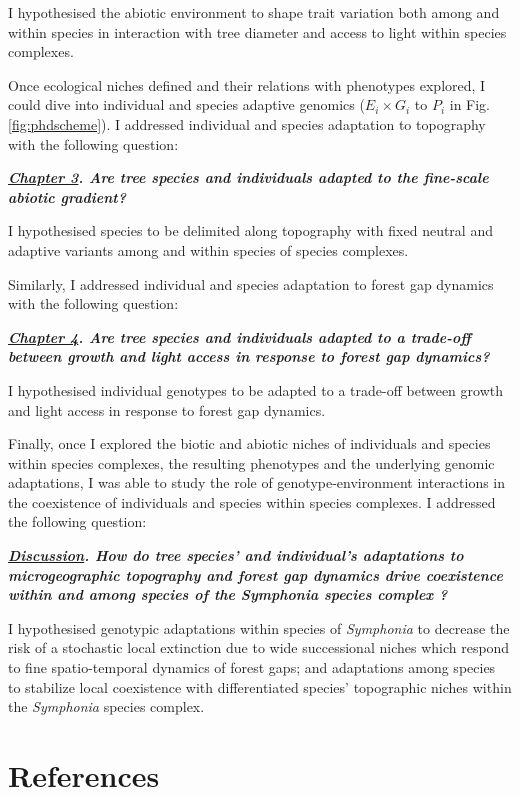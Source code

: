 \documentclass[12pt,twoside,a4paper, a]{article}
\let\oldsection\section
\renewcommand\section{\clearpage\oldsection}
\begin{document}
I hypothesised the abiotic environment to shape trait variation both among and within species in interaction with tree diameter and access to light within species complexes.

Once ecological niches defined and their relations with phenotypes explored, I could dive into individual and species adaptive genomics (\(E_i\times G_i\) to \(P_i\) in Fig. \ref{fig:phdscheme}).
I addressed individual and species adaptation to topography with the following question:

\textbf{\emph{\protect\hyperlink{Ch3}{Chapter 3}. Are tree species and individuals adapted to the fine-scale abiotic gradient?}}

I hypothesised species to be delimited along topography with fixed neutral and adaptive variants among and within species of species complexes.

Similarly, I addressed individual and species adaptation to forest gap dynamics with the following question:

\textbf{\emph{\protect\hyperlink{Ch4}{Chapter 4}. Are tree species and individuals adapted to a trade-off between growth and light access in response to forest gap dynamics?}}

I hypothesised individual genotypes to be adapted to a trade-off between growth and light access in response to forest gap dynamics.

Finally, once I explored the biotic and abiotic niches of individuals and species within species complexes, the resulting phenotypes and the underlying genomic adaptations, I was able to study the role of genotype-environment interactions in the coexistence of individuals and species within species complexes.
I addressed the following question:

\textbf{\emph{\protect\hyperlink{Discussion}{Discussion}. How do tree species' and individual's adaptations to microgeographic topography and forest gap dynamics drive coexistence within and among species of the \emph{Symphonia} species complex ?}}

I hypothesised genotypic adaptations within species of \emph{Symphonia} to decrease the risk of a stochastic local extinction due to wide successional niches which respond to fine spatio-temporal dynamics of forest gaps; and adaptations among species to stabilize local coexistence with differentiated species' topographic niches within the \emph{Symphonia} species complex.

\hypertarget{references}{%
\section*{References}\label{references}}
\end{document}
